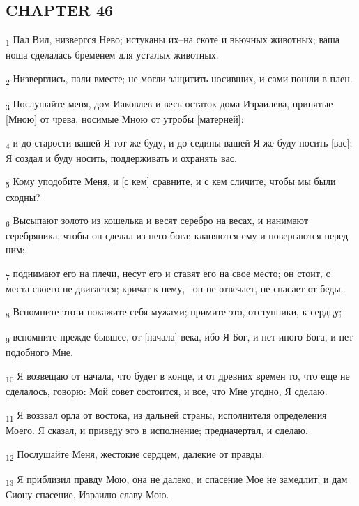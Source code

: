 \subsection{CHAPTER 46}
\begin{tcolorbox}
\textsubscript{1} Пал Вил, низвергся Нево; истуканы их--на скоте и вьючных животных; ваша ноша сделалась бременем для усталых животных.
\end{tcolorbox}
\begin{tcolorbox}
\textsubscript{2} Низверглись, пали вместе; не могли защитить носивших, и сами пошли в плен.
\end{tcolorbox}
\begin{tcolorbox}
\textsubscript{3} Послушайте меня, дом Иаковлев и весь остаток дома Израилева, принятые [Мною] от чрева, носимые Мною от утробы [матерней]:
\end{tcolorbox}
\begin{tcolorbox}
\textsubscript{4} и до старости вашей Я тот же буду, и до седины вашей Я же буду носить [вас]; Я создал и буду носить, поддерживать и охранять вас.
\end{tcolorbox}
\begin{tcolorbox}
\textsubscript{5} Кому уподобите Меня, и [с кем] сравните, и с кем сличите, чтобы мы были сходны?
\end{tcolorbox}
\begin{tcolorbox}
\textsubscript{6} Высыпают золото из кошелька и весят серебро на весах, и нанимают серебряника, чтобы он сделал из него бога; кланяются ему и повергаются перед ним;
\end{tcolorbox}
\begin{tcolorbox}
\textsubscript{7} поднимают его на плечи, несут его и ставят его на свое место; он стоит, с места своего не двигается; кричат к нему, --он не отвечает, не спасает от беды.
\end{tcolorbox}
\begin{tcolorbox}
\textsubscript{8} Вспомните это и покажите себя мужами; примите это, отступники, к сердцу;
\end{tcolorbox}
\begin{tcolorbox}
\textsubscript{9} вспомните прежде бывшее, от [начала] века, ибо Я Бог, и нет иного Бога, и нет подобного Мне.
\end{tcolorbox}
\begin{tcolorbox}
\textsubscript{10} Я возвещаю от начала, что будет в конце, и от древних времен то, что еще не сделалось, говорю: Мой совет состоится, и все, что Мне угодно, Я сделаю.
\end{tcolorbox}
\begin{tcolorbox}
\textsubscript{11} Я воззвал орла от востока, из дальней страны, исполнителя определения Моего. Я сказал, и приведу это в исполнение; предначертал, и сделаю.
\end{tcolorbox}
\begin{tcolorbox}
\textsubscript{12} Послушайте Меня, жестокие сердцем, далекие от правды:
\end{tcolorbox}
\begin{tcolorbox}
\textsubscript{13} Я приблизил правду Мою, она не далеко, и спасение Мое не замедлит; и дам Сиону спасение, Израилю славу Мою.
\end{tcolorbox}

